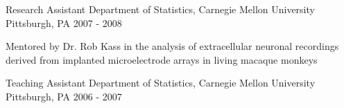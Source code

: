 \begin{cventries}

\cventry
{Research Assistant} %
{Department of Statistics, Carnegie Mellon University} %
{Pittsburgh, PA} %
{2007 - 2008} %
{ %
\begin{cvitems}
\item {Mentored by Dr. Rob Kass in the analysis of extracellular neuronal recordings derived from implanted microelectrode arrays in living macaque monkeys}
\end{cvitems}
}


\cventry
{Teaching Assistant} %
{Department of Statistics, Carnegie Mellon University} %
{Pittsburgh, PA} %
{2006 - 2007} %
{ %
}


\end{cventries} 